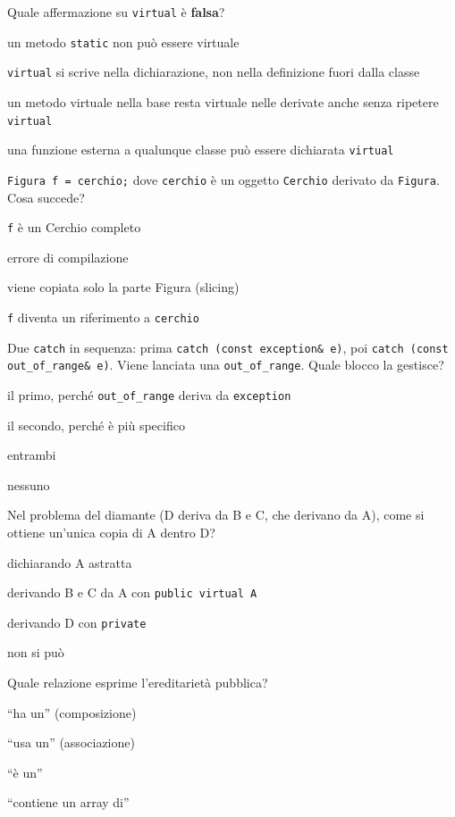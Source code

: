 \begin{quiz}{Quale affermazione su \texttt{virtual} è \textbf{falsa}?}
  \item un metodo \texttt{static} non può essere virtuale
  \item \texttt{virtual} si scrive nella dichiarazione, non nella definizione fuori dalla classe
  \item un metodo virtuale nella base resta virtuale nelle derivate anche senza ripetere \texttt{virtual}
  \item una funzione esterna a qualunque classe può essere dichiarata \texttt{virtual}
\end{quiz}

\begin{quiz}{\texttt{Figura f = cerchio;} dove \texttt{cerchio} è un oggetto \texttt{Cerchio} derivato da \texttt{Figura}. Cosa succede?}
  \item \texttt{f} è un Cerchio completo
  \item errore di compilazione
  \item viene copiata solo la parte Figura (slicing)
  \item \texttt{f} diventa un riferimento a \texttt{cerchio}
\end{quiz}

\begin{quiz}{Due \texttt{catch} in sequenza: prima \texttt{catch (const exception\& e)}, poi \texttt{catch (const out\_of\_range\& e)}. Viene lanciata una \texttt{out\_of\_range}. Quale blocco la gestisce?}
  \item il primo, perché \texttt{out\_of\_range} deriva da \texttt{exception}
  \item il secondo, perché è più specifico
  \item entrambi
  \item nessuno
\end{quiz}

\begin{quiz}{Nel problema del diamante (D deriva da B e C, che derivano da A), come si ottiene un'unica copia di A dentro D?}
  \item dichiarando A astratta
  \item derivando B e C da A con \texttt{public virtual A}
  \item derivando D con \texttt{private}
  \item non si può
\end{quiz}

\begin{quiz}{Quale relazione esprime l'ereditarietà pubblica?}
  \item ``ha un'' (composizione)
  \item ``usa un'' (associazione)
  \item ``è un''
  \item ``contiene un array di''
\end{quiz}

